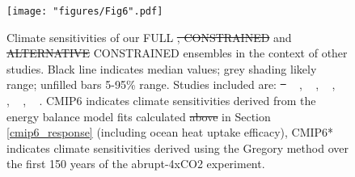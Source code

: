 \documentclass[gmd, manuscript]{copernicus}
\providecommand{\DIFadd}[1]{{\protect\color{blue}#1}} %
\providecommand{\DIFdel}[1]{{\protect\color{red}\sout{#1}}}                      %
\providecommand{\DIFaddbegin}{} %
\providecommand{\DIFaddend}{} %
\providecommand{\DIFdelbegin}{} %
\providecommand{\DIFdelend}{} %
\providecommand{\DIFaddFL}[1]{\DIFadd{#1}} %
\providecommand{\DIFdelFL}[1]{\DIFdel{#1}} %
\providecommand{\DIFaddbeginFL}{} %
\providecommand{\DIFaddendFL}{} %
\providecommand{\DIFdelbeginFL}{} %
\providecommand{\DIFdelendFL}{} %
\begin{document}
\DIFdelend %
\DIFdelbegin %
\DIFdelend \DIFaddbegin \clearpage
\DIFaddend \begin{figure}[t]
    \DIFdelbeginFL %
\DIFdelendFL \DIFaddbeginFL \texttt{[image: "figures/Fig6".pdf]}
    \DIFaddendFL \caption{Climate sensitivities of our FULL \DIFdelbeginFL \DIFdelFL{, CONSTRAINED }\DIFdelendFL and \DIFdelbeginFL \DIFdelFL{ALTERNATIVE }\DIFdelendFL \DIFaddbeginFL \DIFaddFL{CONSTRAINED }\DIFaddendFL ensembles in the context of other studies. Black line indicates median values; grey shading likely range; unfilled bars 5-95\% range. Studies included are: \DIFdelbeginFL \DIFdelFL{\mbox{%
\citet{Nijsse2020,Tokarska2020a,Jimenez-de-la-Cuesta2019,Sherwood2020}}\hspace{0pt}%
}\DIFdelendFL \DIFaddbeginFL \DIFaddFL{\mbox{%
\citet[B20]{Brunner2020}}\hspace{0pt}%
, \mbox{%
\citet[C19]{Jimenez-de-la-Cuesta2019}}\hspace{0pt}%
, \mbox{%
\citet[N20]{Nijsse2020}}\hspace{0pt}%
, \mbox{%
\citet[R21]{Ribes2021}}\hspace{0pt}%
, \mbox{%
\citet[S20]{Sherwood2020}}\hspace{0pt}%
, \mbox{%
\citet[T20]{Tokarska2020a}}\hspace{0pt}%
}\DIFaddendFL . CMIP6 indicates climate sensitivities derived from the energy balance model fits calculated \DIFdelbeginFL \DIFdelFL{above }\DIFdelendFL \DIFaddbeginFL \DIFaddFL{in Section \ref{cmip6_response} }\DIFaddendFL (including ocean heat uptake efficacy), CMIP6* indicates climate sensitivities derived using the Gregory method \citep{Gregory2004} over the first 150 years of the abrupt-4xCO2 experiment.}
    \label{fig:clim_sens_comp}
\end{figure}
\clearpage
\end{document}
